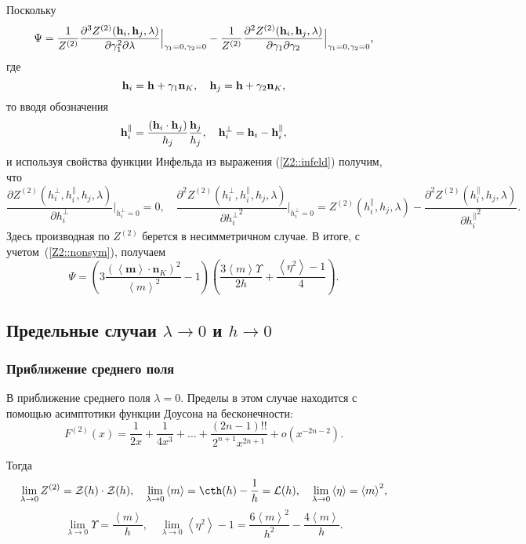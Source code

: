 \documentclass[12pt]{article}
\def\m{\mathbf m{}}
\def\n{\mathbf n{}}
\def\h{{\bf h}}
\def\sr#1{\left<#1\right>}
\def\ZV{Z^{(2)}}
\def\FV{F^{(2)}}
\def\L{{\mathcal L}}
\def\Z{{\mathcal Z}}
\begin{document}
Поскольку
\begin{equation*}
    \Psi = \frac{1}{\ZV}\frac{\partial^3 \ZV(\h_i, \h_j, \lambda)}{\partial \gamma_1^2 \partial \lambda} \Big|_{\gamma_1=0, \gamma_2=0} - \frac{1}{\ZV}\frac{\partial^2 \ZV(\h_i, \h_j, \lambda)}{\partial \gamma_1 \partial \gamma_2} \Big|_{\gamma_1=0, \gamma_2=0},
\end{equation*}
где
\begin{equation*}
    \h_i = \h + \gamma_1 \n_K, \quad \h_j = \h + \gamma_2 \n_K,
\end{equation*}
то вводя обозначения
\begin{equation*}
    \h_i^\parallel = \frac{(\h_i \cdot \h_j)}{h_j} \frac{\h_j}{h_j}, \quad \h_i^\perp = \h_i - \h_i^\parallel,
\end{equation*}
и используя свойства функции Инфельда из выражения (\ref{Z2::infeld}) получим, что
\begin{equation*}
    \frac{\partial \ZV (h_i^\perp, h_i^\parallel, h_j, \lambda)}{\partial h_i^\perp} \Big|_{h_i^\perp=0} = 0, \quad \frac{\partial^2 \ZV (h_i^\perp, h_i^\parallel, h_j, \lambda)}{\partial {h_i^\perp}^2} \Big|_{h_i^\perp=0} = \ZV (h_i^\parallel, h_j, \lambda) - \frac{\partial^2 \ZV (h_i^\parallel, h_j, \lambda)}{\partial {h_i^\parallel}^2}.
\end{equation*}
Здесь производная по $\ZV$ берется в несимметричном случае. В итоге, с учетом~(\ref{Z2::nonsym}), получаем
\begin{equation}\label{psi::eq}
  \Psi = \left(3\frac{(\sr\m \cdot \n_K)^2}{\sr{m}^2} - 1\right)\left(\frac{3 \sr m \Upsilon}{2 h} + \frac{\sr{\eta^2}-1}4\right).
\end{equation}

\subsection*{Предельные случаи $\lambda \rightarrow 0$ и $h \rightarrow 0$}
\subsubsection*{Приближение среднего поля}
В приближение среднего поля $\lambda=0$. Пределы в этом случае находится с помощью асимптотики функции Доусона на бесконечности:
\begin{equation*}
    \FV(x) = \frac{1}{2x}+\frac{1}{4x^3}+\dots+\frac{(2n-1)!!}{2^{n+1}x^{2n+1}}+o(x^{-2n-2}).
\end{equation*}

Тогда
\begin{equation*}
    \lim_{\lambda \rightarrow 0} \ZV = \Z(h) \cdot \Z(h), \quad \lim_{\lambda \rightarrow 0} \sr m = \cth(h) - \frac{1}{h} = \L(h), \quad \lim_{\lambda \rightarrow 0} \sr \eta = {\sr m}^2,
\end{equation*}
\begin{equation*}
    \lim_{\lambda \rightarrow 0} \Upsilon = \frac{\sr m}{h}, \quad \lim_{\lambda \rightarrow 0} \sr{\eta^2} - 1 = \frac{6 \left<m\right>^{2}}{h^{2}} - \frac{4 \left<m\right>}{h}.
\end{equation*}
 
\end{document}
